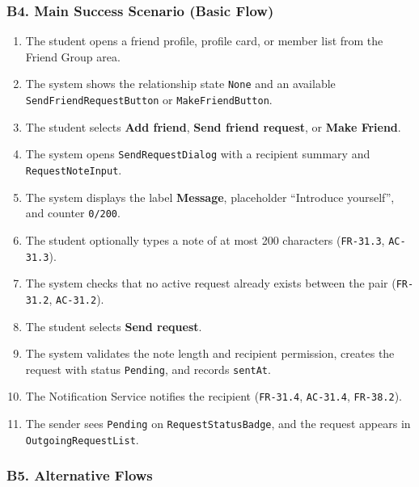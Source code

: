 \documentclass[12pt]{article}
\begin{document}
\hypertarget{sec:b4-main-success-scenario-basic-flow}{}
\subsubsection*{B4. Main Success Scenario (Basic Flow)}
\par\medskip

\begin{enumerate}
\item The student opens a friend profile, profile card, or member list from the Friend Group area.
\item The system shows the relationship state \texttt{None} and an available \texttt{SendFriendRequestButton} or \texttt{MakeFriendButton}.
\item The student selects \textbf{Add friend}, \textbf{Send friend request}, or \textbf{Make Friend}.
\item The system opens \texttt{SendRequestDialog} with a recipient summary and \texttt{RequestNoteInput}.
\item The system displays the label \textbf{Message}, placeholder “Introduce yourself”, and counter \texttt{0/200}.
\item The student optionally types a note of at most 200 characters (\texttt{FR-31.3}, \texttt{AC-31.3}).
\item The system checks that no active request already exists between the pair (\texttt{FR-31.2}, \texttt{AC-31.2}).
\item The student selects \textbf{Send request}.
\item The system validates the note length and recipient permission, creates the request with status \texttt{Pending}, and records \texttt{sentAt}.
\item The Notification Service notifies the recipient (\texttt{FR-31.4}, \texttt{AC-31.4}, \texttt{FR-38.2}).
\item The sender sees \texttt{Pending} on \texttt{RequestStatusBadge}, and the request appears in \texttt{OutgoingRequestList}.
\end{enumerate}
\par\medskip

\hypertarget{sec:b5-alternative-flows}{}
\subsubsection*{B5. Alternative Flows}
\par\medskip
\end{document}
